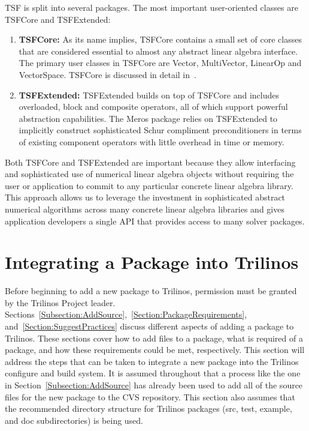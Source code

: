 \documentclass[12pt,relax]{TrilinosDevGuide}
\begin{document}
TSF is split into several packages.  The most important user-oriented
classes are TSFCore and TSFExtended:
\begin{enumerate}
\item {\bf TSFCore:} As its name implies, TSFCore contains a small set
of core classes that are considered essential to almost any abstract
linear algebra interface.  The primary user classes in TSFCore are
Vector, MultiVector, LinearOp and VectorSpace. TSFCore is discussed in
detail in~\cite{TSFCore}.
\item {\bf TSFExtended:} TSFExtended builds on top of TSFCore and
includes overloaded, block and composite operators, all of
which support powerful abstraction capabilities.  The Meros package
relies on TSFExtended to implicitly construct sophisticated
Schur compliment preconditioners in terms of existing component
operators with little overhead in time or memory.
\end{enumerate}

Both TSFCore and TSFExtended are important because they allow
interfacing and sophisticated use of numerical linear algebra objects
without requiring the user or application to commit to any particular
concrete linear algebra library.  This approach allows us to leverage
the investment in sophisticated abstract numerical algorithms across
many concrete linear algebra libraries and gives application
developers a single API that provides access to many solver packages.


\section{Integrating a Package into Trilinos}
\label{Section:IntegratingPackages}
Before beginning to add a new package to Trilinos, permission must be 
granted by the Trilinos Project leader.  
Sections~\ref{Subsection:AddSource},~\ref{Section:PackageRequirements}, 
and~\ref{Section:SuggestPractices} discuss different aspects of adding a 
package to Trilinos.  These sections cover how to add files to a package,
what is required of a package, and how these requirements could be met, 
respectively.  This section will address the steps that can be taken to 
integrate a new package into the Trilinos configure and build system.  It is 
assumed throughout that a process like the one in 
Section~\ref{Subsection:AddSource} has already been used to add all of the 
source files for the new package to the CVS repository.  This section also 
assumes that the recommended directory structure for Trilinos packages 
(src, test, example, and doc subdirectories) is being used.
\end{document}
